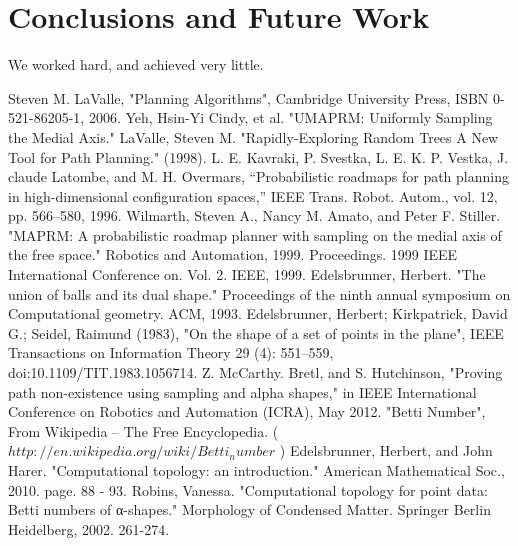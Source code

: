 \documentclass[11pt]{article}
\begin{document}
\section{Conclusions and Future Work}\label{conclusions}
We worked hard, and achieved very little.


\begin{thebibliography}{1}

   Steven M. LaValle, "Planning Algorithms", Cambridge University Press, ISBN 0-521-86205-1, 2006.
   Yeh, Hsin-Yi Cindy, et al. "UMAPRM: Uniformly Sampling the Medial Axis."
   LaValle, Steven M. "Rapidly-Exploring Random Trees A New Tool for Path Planning." (1998).
   L. E. Kavraki, P. Svestka, L. E. K. P. Vestka, J. claude Latombe, and M. H. Overmars, “Probabilistic roadmaps for path planning in high-dimensional configuration spaces,” IEEE Trans. Robot. Autom., vol. 12, pp. 566–580, 1996.
   Wilmarth, Steven A., Nancy M. Amato, and Peter F. Stiller. "MAPRM: A probabilistic roadmap planner with sampling on the medial axis of the free space." Robotics and Automation, 1999. Proceedings. 1999 IEEE International Conference on. Vol. 2. IEEE, 1999.
   Edelsbrunner, Herbert. "The union of balls and its dual shape." Proceedings of the ninth annual symposium on Computational geometry. ACM, 1993.
   Edelsbrunner, Herbert; Kirkpatrick, David G.; Seidel, Raimund (1983), "On the shape of a set of points in the plane", IEEE Transactions on Information Theory 29 (4): 551–559, doi:10.1109/TIT.1983.1056714.
   Z. McCarthy. Bretl, and S. Hutchinson, "Proving path non-existence using sampling and alpha shapes," in IEEE International Conference on Robotics and Automation (ICRA), May 2012.
   "Betti Number", From Wikipedia -- The Free Encyclopedia. ( $http://en.wikipedia.org/wiki/Betti_number$ )    
  Edelsbrunner, Herbert, and John Harer. "Computational topology: an introduction." American Mathematical Soc., 2010. page. 88 - 93.
   Robins, Vanessa. "Computational topology for point data: Betti numbers of α-shapes." Morphology of Condensed Matter. Springer Berlin Heidelberg, 2002. 261-274.
\end{thebibliography}
\end{document}
